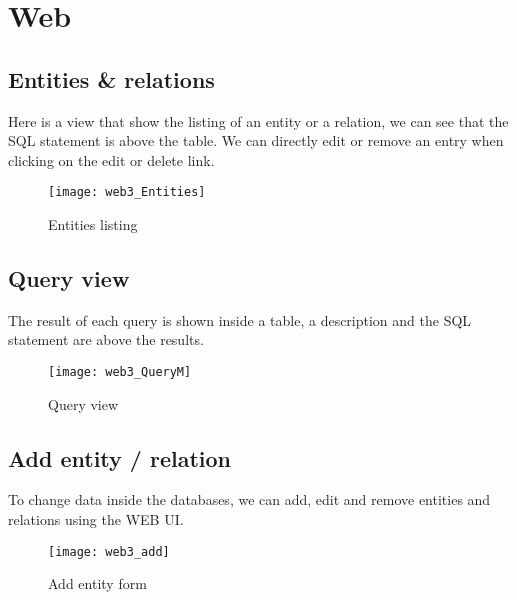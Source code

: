 %
%
%
%

\chapter{Web}

\section{Entities \& relations}

Here is a view that show the listing of an entity or a relation, we can see that the SQL statement is above the table.
We can directly edit or remove an entry when clicking on the edit or delete link.

\begin{figure}[!ht]
	\centering
	\texttt{[image: web3\_Entities]}
	\caption{Entities listing\label{fig:ddl-scheme}}
\end{figure}

\newpage
\section{Query view}

The result of each query is shown inside a table, a description and the SQL statement are above the results.

\begin{figure}[!ht]
	\centering
	\texttt{[image: web3\_QueryM]}
	\caption{Query view\label{fig:ddl-scheme}}
\end{figure}

\newpage
\section{Add entity / relation}

To change data inside the databases, we can add, edit and remove entities and relations using the WEB UI.

\begin{figure}[!ht]
	\centering
	\texttt{[image: web3\_add]}
	\caption{Add entity form\label{fig:ddl-scheme}}
\end{figure}


